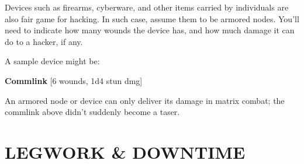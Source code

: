 \documentclass[oneside,10pt]{article}
\begin{document}
\begin{multicols}{2}
  Devices such as firearms, cyberware, and other items carried by
  individuals are also fair game for hacking. In such case, assume
  them to be armored nodes. You’ll need to indicate how many wounds
  the device has, and how much damage it can do to a hacker, if any.

  A sample device might be:
  \begin{dent}
    \textbf{Commlink} [6 wounds, 1d4 stun dmg]
  \end{dent}
  An armored node or device can only deliver its damage in matrix
  combat; the commlink above didn’t suddenly become a taser.

\end{multicols}


\section{LEGWORK \& DOWNTIME}
\end{document}
